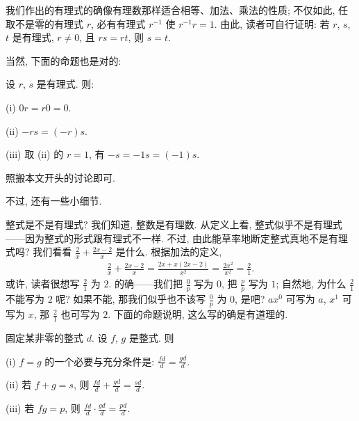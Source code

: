 我们作出的有理式的确像有理数那样适合相等、加法、乘法的性质; 不仅如此, 任取不是零的有理式 $r$, 必有有理式 $r^{-1}$ 使 $r^{-1} r = 1$. 由此, 读者可自行证明: 若 $r$, $s$, $t$ 是有理式, $r \neq 0$, 且 $rs = rt$, 则 $s = t$.

当然, 下面的命题也是对的:
\begin{proposition}
    设 $r$, $s$ 是有理式. 则:

    (i) $0r = r0 = 0$.

    (ii) $-rs = (-r)s$.

    (iii) 取 (ii) 的 $r = 1$, 有 $-s = -1s = (-1)s$.
\end{proposition}

\begin{pf}
    照搬本文开头的讨论即可.
\end{pf}

不过, 还有一些小细节.

整式是不是有理式? 我们知道, 整数是有理数. 从定义上看, 整式似乎不是有理式——因为整式的形式跟有理式不一样. 不过, 由此能草率地断定整式真地不是有理式吗? 我们看看 $\frac{2}{x} + \frac{2x-2}{x}$ 是什么. 根据加法的定义,
\begin{align*}
    \frac{2}{x} + \frac{2x-2}{x} = \frac{2x + x(2x-2)}{x^2} = \frac{2x^2}{x^2} = \frac{2}{1}.
\end{align*}
或许, 读者很想写 $\frac{2}{1}$ 为 $2$. 的确——我们把 $\frac{0}{p}$ 写为 $0$, 把 $\frac{p}{p}$ 写为 $1$; 自然地, 为什么 $\frac{2}{1}$ 不能写为 $2$ 呢? 如果不能, 那我们似乎也不该写 $\frac{0}{p}$ 为 $0$, 是吧? $ax^0$ 可写为 $a$, $x^1$ 可写为 $x$, 那 $\frac{2}{1}$ 也可写为 $2$. 下面的命题说明, 这么写的确是有道理的.

\begin{proposition}
    固定某非零的整式 $d$. 设 $f$, $g$ 是整式. 则

    (i) $f = g$ 的一个必要与充分条件是: $\frac{fd}{d} = \frac{gd}{d}$.

    (ii) 若 $f + g = s$, 则 $\frac{fd}{d} + \frac{gd}{d} = \frac{sd}{d}$.

    (iii) 若 $fg = p$, 则 $\frac{fd}{d} \cdot \frac{gd}{d} = \frac{pd}{d}$.
\end{proposition}

